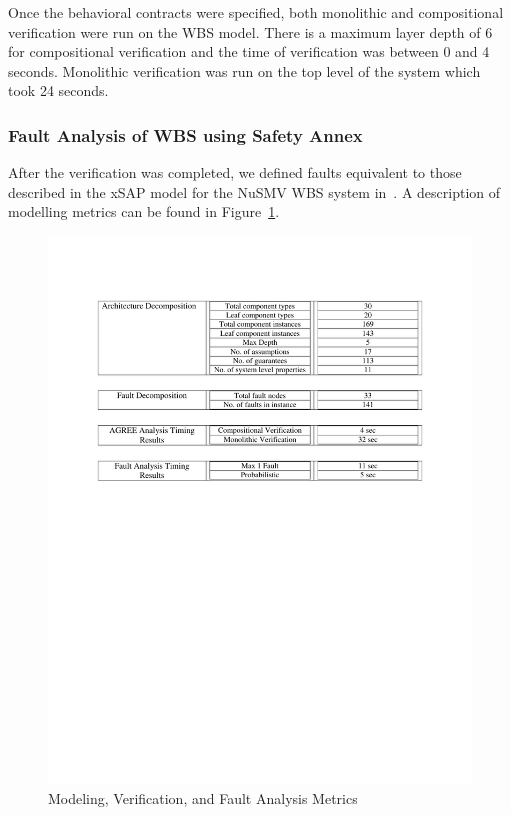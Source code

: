 Once the behavioral contracts were specified, both monolithic and compositional verification were run on the WBS model. There is a maximum layer depth of 6 for compositional verification and the time of verification was between 0 and 4 seconds. Monolithic verification was run on the top level of the system which took 24 seconds. 

\subsubsection{Fault Analysis of WBS using Safety Annex}
After the verification was completed, we defined faults equivalent to those described in the xSAP model for the NuSMV WBS system in~\cite{DBLP:conf/cav/BozzanoCPJKPRT15}. A description of modelling metrics can be found in Figure~\ref{fig:metrics}.

\begin{figure}[h!]
	\vspace{-0.17in}
	\begin{center}
		\includegraphics[trim=0 435 0 90,clip,width=1.0\textwidth]{images/arch_table.pdf}
		\caption{Modeling, Verification, and Fault Analysis Metrics}
 		\label{fig:metrics}
	\end{center}
	\vspace{-0.40in}
\end{figure}


